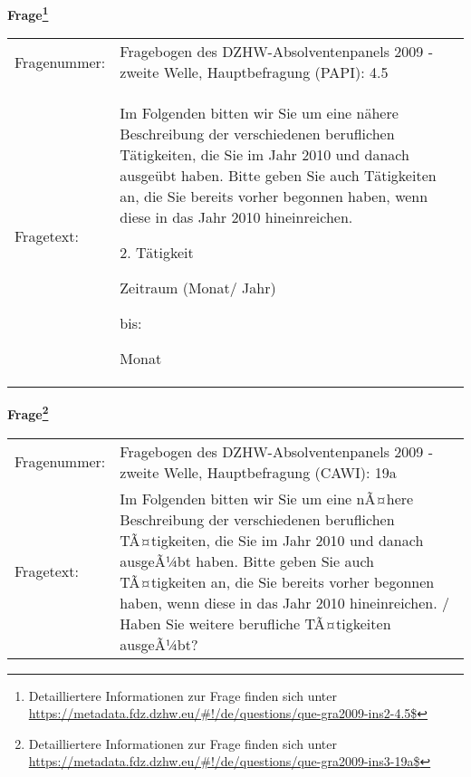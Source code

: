 				\vspace*{0.5cm}
                \noindent\textbf{Frage\footnote{Detailliertere Informationen zur Frage finden sich unter
		              \url{https://metadata.fdz.dzhw.eu/\#!/de/questions/que-gra2009-ins2-4.5$}}}\\
				\begin{tabularx}{\hsize}{@{}lX}
					Fragenummer: &
					  Fragebogen des DZHW-Absolventenpanels 2009 - zweite Welle, Hauptbefragung (PAPI):
					  4.5
 \\
					Fragetext: & Im Folgenden bitten wir Sie um eine nähere Beschreibung der verschiedenen beruflichen Tätigkeiten, die Sie im Jahr 2010 und danach ausgeübt haben. Bitte geben Sie auch Tätigkeiten an, die Sie bereits vorher begonnen haben, wenn diese in das Jahr 2010 hineinreichen.\par  2. Tätigkeit\par  Zeitraum (Monat/ Jahr)\par  bis:\par  Monat \\
				\end{tabularx}
				\vspace*{0.5cm}
                \noindent\textbf{Frage\footnote{Detailliertere Informationen zur Frage finden sich unter
		              \url{https://metadata.fdz.dzhw.eu/\#!/de/questions/que-gra2009-ins3-19a$}}}\\
				\begin{tabularx}{\hsize}{@{}lX}
					Fragenummer: &
					  Fragebogen des DZHW-Absolventenpanels 2009 - zweite Welle, Hauptbefragung (CAWI):
					  19a
 \\
					Fragetext: & Im Folgenden bitten wir Sie um eine nÃ¤here Beschreibung der verschiedenen beruflichen TÃ¤tigkeiten, die Sie im Jahr 2010 und danach ausgeÃ¼bt haben. Bitte geben Sie auch TÃ¤tigkeiten an, die Sie bereits vorher begonnen haben, wenn diese in das Jahr 2010 hineinreichen. / Haben Sie weitere berufliche TÃ¤tigkeiten ausgeÃ¼bt? \\
				\end{tabularx}





